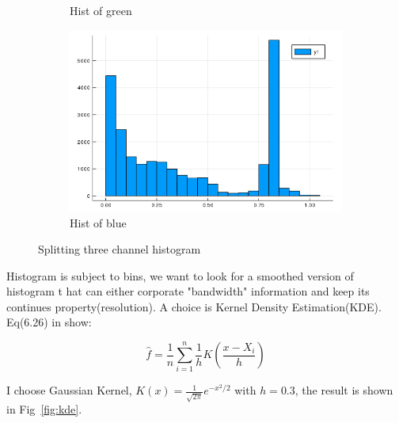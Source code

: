 \documentclass{article}
\begin{document}
\begin{figure}[htb]
\begin{subfigure}[b]{0.24\linewidth}
    \caption{Hist of green}
  \end{subfigure}
  \begin{subfigure}[b]{0.24\linewidth}
    \includegraphics[width=\linewidth]{images/hist_b.png}
    \caption{Hist of blue}
  \end{subfigure}
  \caption{Splitting three channel histogram}
  \label{fig:hist_g_rgb}
\end{figure}

Histogram is subject to bins, we want to look for a smoothed version of histogram t
hat can either corporate "bandwidth" information and keep its continues property(resolution). 
A choice is Kernel Density Estimation(KDE). Eq(6.26) in \cite{wasserman2006all} show:

$$
\hat{f} = \frac{1}{n} \sum_{i=1}^n \frac{1}{h} K\left( \frac{x-X_i}{h} \right)
$$

I choose Gaussian Kernel, $K(x)=\frac{1}{\sqrt{2\pi}}e^{-x^2/2}$ with $h=0.3$, 
the result is shown in Fig~\ref{fig:kde}.
\end{document}

